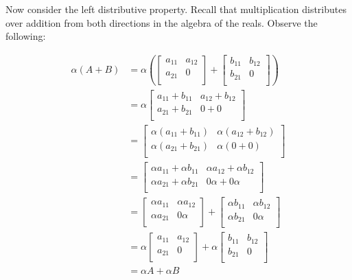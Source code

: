 \documentclass{article}
\begin{document}
Now consider the left distributive property. Recall that multiplication distributes over addition from both directions in the algebra of the reals. Observe the following:

\begin{align*}
  \alpha (A+B)&=\alpha \left( \begin{bmatrix}
    a_{11}  &a_{12}    \\
     a_{21} &0    \\
  \end{bmatrix}+\begin{bmatrix}
    b_{11}  &b_{12}    \\
     b_{21} &0    \\
  \end{bmatrix} \right)\\
  &=\alpha \begin{bmatrix}
    a_{11}+b_{11}   &a_{12}+b_{12}     \\
     a_{21}+b_{21}  &  0+0 \\
  \end{bmatrix}\\
  &=\begin{bmatrix}
    \alpha \left( a_{11}+b_{11}   \right)  & \alpha \left( a_{12}+b_{12}   \right)   \\
     \alpha \left( a_{21}+b_{21}   \right) &\alpha (0+0)   \\
  \end{bmatrix}\\
  &=\begin{bmatrix}
    \alpha a_{11}+\alpha b_{11}   &\alpha a_{12}+\alpha b_{12}     \\
     \alpha a_{21}+\alpha b_{21}  &0\alpha +0\alpha    \\
  \end{bmatrix}\\
  &=\begin{bmatrix}
    \alpha a_{11}  &\alpha a_{12}    \\
     \alpha a_{21} &0\alpha    \\
  \end{bmatrix}+\begin{bmatrix}
    \alpha b_{11}  &\alpha b_{12}    \\
     \alpha b_{21} &0\alpha    \\
  \end{bmatrix}\\
  &=\alpha \begin{bmatrix}
    a_{11}  &a_{12}    \\
     a_{21} &0    \\
  \end{bmatrix}+\alpha \begin{bmatrix}
    b_{11}  &b_{12}    \\
     b_{21} &0    \\
  \end{bmatrix}\\
  &=\alpha A+\alpha B
\end{align*}
\end{document}
